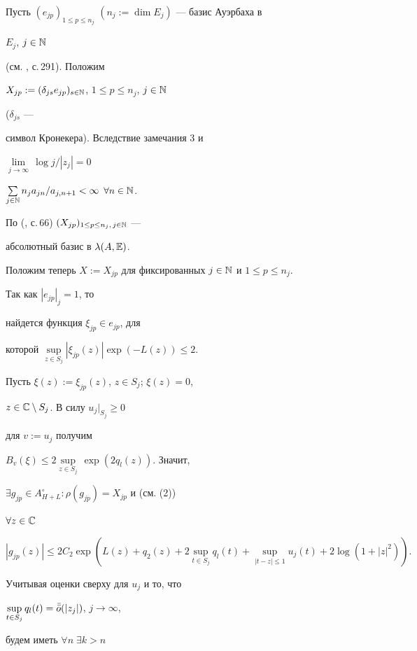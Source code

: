 \begin{pf}
 


Пусть $(e_{jp})_{1\le p\le n_j}$ $(n_j:=\dim E_j)$ --- базис Ауэрбаха в 


$E_j$, $j\in\Bbb N$ 


(см. \cite{Jar}, с.\,291). Положим 


$X_{jp}:=(\delta_{js}e_{jp})_{s\in\Bbb N}$, $1\le p\le n_j$, $j\in\Bbb N$ 


($\delta_{js}$ --- 


символ Кронекера). Вследствие замечания 3 и 


$\lim\limits_{j\to\infty}\,\log j/|z_j|=0$ 


$\sum\limits_{j\in\Bbb N}n_ja_{jn}/a_{j,n+1}<\infty$ $\forall n\in\Bbb N$. 


По (\cite{Mei2}, с.\,66) $(X_{jp})_{1\le p\le n_j,\,j\in\Bbb N}$ --- 


абсолютный базис в $\lambda(A,\Bbb E)$. 


 


Положим теперь $X:=X_{jp}$ для фиксированных $j\in\Bbb N$ и $1\le p\le n_j$. 


Так как $|e_{jp}|_j=1$, то 


найдется функция $\xi_{jp}\in e_{jp}$, для 


которой $\sup\limits_{z\in S_j}|\xi_{jp}(z)|\exp(-L(z))\le 2$. 


Пусть $\xi(z):=\xi_{jp}(z)$, $z\in S_j$; $\xi(z)=0$, 


$z\in\Bbb C\setminus S_j$. В силу $u_j\vert_{S_j}\ge 0$ 


для $v:=u_j$ получим 


$B_v(\xi)\le 2\sup\limits_{z\in S_j}\,\exp(2q_l(z))$. Значит, 


$\exists g_{jp}\in A^\circ_{H+L}:\rho(g_{jp})=X_{jp}$ и (см. (2)) 


$\forall z\in\Bbb C$ 


$$ 


|g_{jp}(z)|\le 2C_2\exp(L(z)+q_2(z)+2\sup_{t\in S_j}q_l(t)+ 


\sup_{|t-z|\le 1} u_j(t)+2\log(1+|z|^2)). 


$$ 


Учитывая оценки сверху для $u_j$ и то, что 


$\sup\limits_{t\in S_j}q_l(t)=\Bar{\Bar o}(|z_j|)$, $j\to\infty$, 


будем иметь $\forall n\;\exists k>n$\linebreak





\end{pf}
